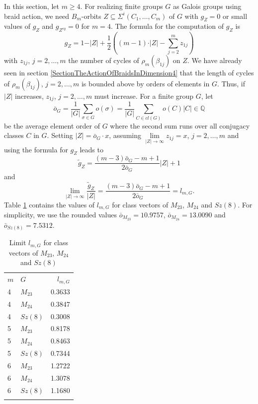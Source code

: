 \documentclass[12pt,a4paper]{article}
\numberwithin{equation}{section}
\numberwithin{table}{section}
\begin{document}
In this section, let $m \geq 4$. For realizing finite groups $G$ as Galois groups using braid action, 
we need $B_m$-orbits $Z \subseteq \Sigma^i(C_1,\dots, C_m)$ of $G$ with $g_Z=0$
or small values of $g_Z$ and $g_{Z^{sy}}=0$ for $m=4$.
The formula for the computation of $g_Z$ is
$$g_Z = 1 -  \vert Z \vert  + \frac{1}{2}((m-1)\cdot  \vert Z \vert  - \sum\limits_{j=2}^{m} z_{1j})$$
with $z_{1j}$, $j=2,\dots,m$ the number of cycles of $\rho_m(\beta_{1j})$ on $Z$.
We have already seen in section \ref{SectionTheActionOfBraidsInDimension4} that the length of 
cycles of $\rho_m(\beta_{1j})$, $j=2,\dots,m$ is bounded above by orders of elements in $G$.
Thus, if $ \vert Z \vert $ increases, $z_{1j}$, $j=2,\dots,m$ must increase. 
For a finite group $G$, let
$${\bar o}_G = \frac{1}{ \vert G \vert } \sum\limits_{\sigma \in G} o(\sigma) =
\frac{1}{ \vert G \vert } \sum\limits_{C \in cl(G)} o(C) \vert C \vert  \in \mathbb{Q}$$
be the average element order of $G$ where the second sum runs over all conjugacy classes $C$ in $G$.
Setting $ \vert Z \vert ={\bar o}_G \cdot x$, assuming  $\lim\limits_{ \vert Z \vert \to\infty} z_{1j}=x$, $j=2,\dots,m$
and using the formula for $g_Z$ leads to
$${\tilde g}_Z = \frac{(m-3){\bar o}_G -m+1}{2{\bar o}_G} \vert Z \vert +1$$
and
$$\lim\limits_{\vert Z \vert \to\infty} \frac{{\tilde g}_Z}{\vert Z \vert} =
\frac{(m-3){\bar o}_G -m+1}{2{\bar o}_G} = l_{m, G}.$$
Table \ref{tab:Data_LimitRatioClassvectorsM23M24Sz8} contains the values of $l_{m, G}$ for
class vectors of $M_{23}$, $M_{24}$ and $Sz(8)$. For simplicity, we use the rounded values
${\bar o}_{M_{23}}=10.9757$, ${\bar o}_{M_{24}}=13.0090$ and ${\bar o}_{Sz(8)}=7.5312$.
%
\begin{table}[!htbp]
\centering
\footnotesize
\captionsetup{font=footnotesize}
\caption{Limit $l_{m, G}$ for class vectors of $M_{23}$, $M_{24}$ and $Sz(8)$}
\label{tab:Data_LimitRatioClassvectorsM23M24Sz8}
\begin{tabular}{llr}
\hline\noalign{\smallskip}
$m$ & $G$ & $l_{m, G}$ \\
\noalign{\smallskip}\hline\noalign{\smallskip}
4 & $M_{23}$ & 0.3633 \\
4 & $M_{24}$ & 0.3847 \\
4 & $Sz(8)$ & 0.3008 \\
\noalign{\smallskip}\hline\noalign{\smallskip}
5 & $M_{23}$ & 0.8178 \\
5 & $M_{24}$ & 0.8463 \\
5 & $Sz(8)$ & 0.7344 \\
\noalign{\smallskip}\hline\noalign{\smallskip}
6 & $M_{23}$ & 1.2722 \\
6 & $M_{24}$ & 1.3078 \\
6 & $Sz(8)$ & 1.1680 \\
\noalign{\smallskip}\hline
\end{tabular}
\end{table}
\end{document}
